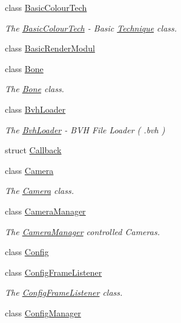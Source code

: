 \begin{DoxyCompactItemize}
class \hyperlink{classEngine_1_1BasicColourTech}{Basic\+Colour\+Tech}
\begin{DoxyCompactList}\small\item\em The \hyperlink{classEngine_1_1BasicColourTech}{Basic\+Colour\+Tech} -\/ Basic \hyperlink{classEngine_1_1Technique}{Technique} class. \end{DoxyCompactList}\item 
class \hyperlink{classEngine_1_1BasicRenderModul}{Basic\+Render\+Modul}
\item 
class \hyperlink{classEngine_1_1Bone}{Bone}
\begin{DoxyCompactList}\small\item\em The \hyperlink{classEngine_1_1Bone}{Bone} class. \end{DoxyCompactList}\item 
class \hyperlink{classEngine_1_1BvhLoader}{Bvh\+Loader}
\begin{DoxyCompactList}\small\item\em The \hyperlink{classEngine_1_1BvhLoader}{Bvh\+Loader} -\/ B\+V\+H File Loader ( .bvh ) \end{DoxyCompactList}\item 
struct \hyperlink{structEngine_1_1Callback}{Callback}
\item 
class \hyperlink{classEngine_1_1Camera}{Camera}
\begin{DoxyCompactList}\small\item\em The \hyperlink{classEngine_1_1Camera}{Camera} class. \end{DoxyCompactList}\item 
class \hyperlink{classEngine_1_1CameraManager}{Camera\+Manager}
\begin{DoxyCompactList}\small\item\em The \hyperlink{classEngine_1_1CameraManager}{Camera\+Manager} controlled Cameras. \end{DoxyCompactList}\item 
class \hyperlink{classEngine_1_1Config}{Config}
\item 
class \hyperlink{classEngine_1_1ConfigFrameListener}{Config\+Frame\+Listener}
\begin{DoxyCompactList}\small\item\em The \hyperlink{classEngine_1_1ConfigFrameListener}{Config\+Frame\+Listener} class. \end{DoxyCompactList}\item 
class \hyperlink{classEngine_1_1ConfigManager}{Config\+Manager}
\item 

\end{DoxyCompactItemize}
